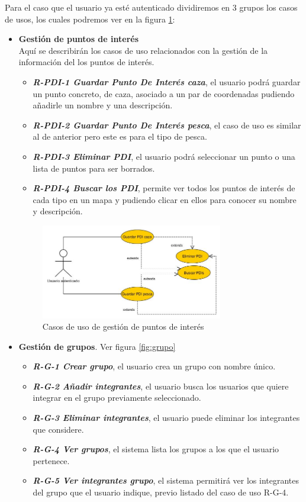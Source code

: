 Para el caso que el usuario ya esté autenticado dividiremos en 3 grupos los casos de usos, los cuales podremos ver en la figura \ref{fig:PDI}:
\begin{itemize}
\item \textbf{Gestión de puntos de interés}\\
Aquí se describirán los casos de uso relacionados con la gestión  de la información del los puntos de interés.
\begin{itemize}
\item\textbf{\textit{ R-PDI-1 Guardar Punto De Interés caza}}, el usuario podrá guardar un punto concreto, de caza, asociado a un par de coordenadas pudiendo añadirle un nombre y una descripción.
\item\textit{ \textbf{R-PDI-2 Guardar Punto De Interés pesca}}, el caso de uso es similar al de anterior pero este es para el tipo de pesca.
\item \textbf{\textit{R-PDI-3 Eliminar PDI}}, el usuario podrá seleccionar un punto o una lista de puntos para ser borrados.
\item \textbf{\textit{R-PDI-4 Buscar los PDI}}, permite ver todos los puntos de interés de cada tipo en un mapa y pudiendo clicar en ellos para conocer su nombre y descripción.
\end{itemize} 

\begin{figure}[H]
		\centering
		\includegraphics[width=0.75\textwidth] {PDI.jpg}
		\caption{Casos de uso de gestión de puntos de interés }\label{fig:PDI}
	\end{figure}
	
	
	
\item \textbf{Gestión de grupos}. Ver figura \ref{fig:grupo}
\begin{itemize}
\item\textbf{ \textit{R-G-1 Crear grupo}}, el usuario crea un grupo con nombre único.
\item\textbf{\textit{ R-G-2 Añadir integrantes}}, el usuario busca los usuarios que quiere integrar en el grupo previamente seleccionado.
\item \textbf{\textit{R-G-3 Eliminar integrantes}}, el usuario puede eliminar los integrantes que considere.
\item \textbf{\textit{R-G-4 Ver grupos}}, el sistema lista los grupos a los que el usuario pertenece.
\item \textbf{\textit{R-G-5 Ver integrantes grupo}}, el sistema permitirá ver los integrantes del grupo que el usuario indique, previo listado del caso de uso R-G-4. 


\end{itemize}
\end{itemize}
